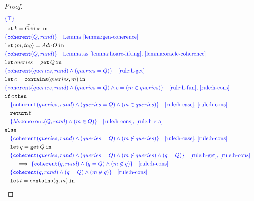 \begin{proof}
\scriptsize{
\begin{align*}
&\begin{aligned}
    &\color{blue} \{ \top \} \\
    &\letin{k = \widetilde{Gen} \star}{} \\
    &\color{blue} \{ \mathtt{coherent}(Q, rand) \} \quad \text{Lemma~\ref{lemma:gen-coherence}} \\
    &\letin{\lis{m,tag} = Adv\,O}{} \\
    &\color{blue} \{ \mathtt{coherent}(Q, rand) \} \quad \text{Lemmatas~\ref{lemma:hoare-lifting}, \ref{lemma:oracle-coherence}} \\
    &\letin{queries = \get Q}{} \\
    &\color{blue} \{ \mathtt{coherent}(queries, rand) \land (queries=Q)\} \quad \text{\ref{rule:h-get}} \\
    &\letin{c=\mathtt{contains}(queries, m)}{} \\
    &\color{blue} \{ \mathtt{coherent}(queries, rand) \land (queries=Q) \land c=(m\in queries) \} \quad \text{\ref{rule:h-fun}, \ref{rule:h-cons}} \\
    & \mathtt{if}\, c\, \mathtt{then} \\
    &\quad \color{blue} \{ \mathtt{coherent}(queries, rand) \land (queries=Q) \land (m\in queries) \} \quad \text{\ref{rule:h-case}, \ref{rule:h-cons}} \\
    &\quad \return \false \\
    &\quad \color{blue} \{ \lambda b.\mathtt{coherent}(Q, rand) \land (m\in Q) \} \quad \text{\ref{rule:h-cons}, \ref{rule:h-eta}} \\
    &\mathtt{else} \\
    &\quad \color{blue} \{ \mathtt{coherent}(queries, rand) \land (queries=Q) \land (m \not\in queries) \} \quad \text{\ref{rule:h-case}, \ref{rule:h-cons}} \\
    &\quad\letin{q=\get Q}{} \\
    &\quad \color{blue} \{ \mathtt{coherent}(queries, rand) \land (queries=Q) \land (m \not\in queries) \land (q = Q) \} \quad \text{\ref{rule:h-get}, \ref{rule:h-cons}} \\
    &\qquad \implies \color{blue} \{ \mathtt{coherent}(q, rand) \land (q=Q) \land (m \not\in q) \} \quad \text{\ref{rule:h-cons}} \\
    &\quad \color{blue} \{ \mathtt{coherent}(q, rand) \land (q=Q) \land (m \not\in q) \} \quad \text{\ref{rule:h-cons}} \\
    &\quad\letin{t=\mathtt{contains}(q,m)}{} \\

\end{aligned}
\end{align*}}
\end{proof}
